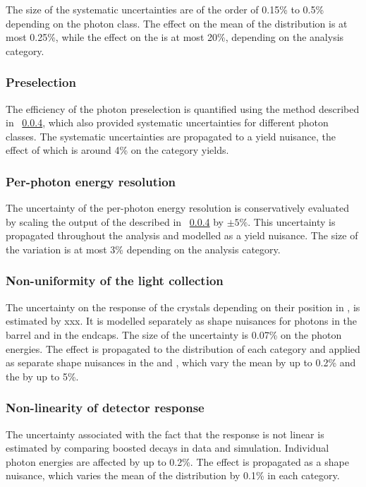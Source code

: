 The size of the systematic uncertainties are of the order of 0.15\% to 0.5\% depending on the photon class. The effect on the mean of the \mgg distribution is at most 0.25\%, while the effect on the \effSigma is at most 20\%, depending on the analysis category.

\subsubsection{Preselection}
The efficiency of the photon preselection is quantified using the \TagAndProbe method described in \Sec~\ref{}, which also provided systematic uncertainties for different photon classes. The systematic uncertainties are propagated to a yield nuisance,
the effect of which is around 4\% on the category yields.

\subsubsection{Per-photon energy resolution}
The uncertainty of the per-photon energy resolution is conservatively evaluated by scaling the output of the \PhoEnergyBdt described in \Sec~\ref{} by $\pm5\%$. This uncertainty is propagated throughout the analysis and modelled as a yield nuisance. The size of the variation is at most 3\% depending on the analysis category.

\subsubsection{Non-uniformity of the light collection}
The uncertainty on the response of the \ECAL crystals depending on their position in \eta, is estimated by xxx. It is modelled separately as shape nuisances for photons in the barrel and in the endcaps. The size of the uncertainty is 0.07\% on the photon energies. The effect is propagated to the \mgg distribution of each category and applied as separate shape nuisances in the \EE and \EB, which vary the mean by up to 0.2\% and the \effSigma by up to 5\%.

\subsubsection{Non-linearity of detector response}
The uncertainty associated with the fact that the \ECAL response is not linear is estimated by comparing boosted \Zee decays in data and simulation. Individual photon energies are affected by up to 0.2\%. The effect is propagated as a shape nuisance, which varies the mean of the \mgg distribution by 0.1\% in each category.

